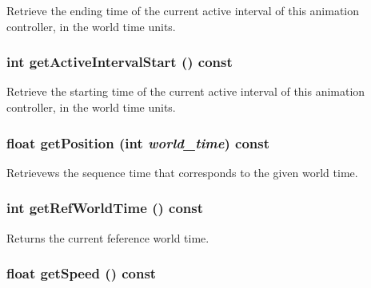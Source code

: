 Retrieve the ending time of the current active interval of this animation controller, in the world time units. \hypertarget{classm3g_1_1AnimationController_c66e837ae4152477eabdfcbe7fb21adb}{
\subsubsection[{getActiveIntervalStart}]{\setlength{\rightskip}{0pt plus 5cm}int getActiveIntervalStart () const}}
\label{classm3g_1_1AnimationController_c66e837ae4152477eabdfcbe7fb21adb}


Retrieve the starting time of the current active interval of this animation controller, in the world time units. \hypertarget{classm3g_1_1AnimationController_dfdea73153cb34c26979575efda149e2}{
\subsubsection[{getPosition}]{\setlength{\rightskip}{0pt plus 5cm}float getPosition (int {\em world\_\-time}) const}}
\label{classm3g_1_1AnimationController_dfdea73153cb34c26979575efda149e2}


Retrievews the sequence time that corresponds to the given world time. \hypertarget{classm3g_1_1AnimationController_103e1bd81eba2cc90f31e7fdc4f3c601}{
\subsubsection[{getRefWorldTime}]{\setlength{\rightskip}{0pt plus 5cm}int getRefWorldTime () const}}
\label{classm3g_1_1AnimationController_103e1bd81eba2cc90f31e7fdc4f3c601}


Returns the current feference world time. \hypertarget{classm3g_1_1AnimationController_4ab87c5df7c3eadd17b318a426773fcb}{
\subsubsection[{getSpeed}]{\setlength{\rightskip}{0pt plus 5cm}float getSpeed () const}}
\label{classm3g_1_1AnimationController_4ab87c5df7c3eadd17b318a426773fcb}


